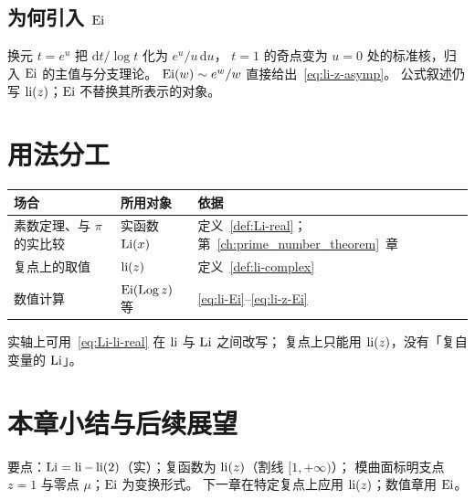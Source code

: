 \subsection{为何引入 \texorpdfstring{$\operatorname{Ei}$}{Ei}}

换元 $t=e^{u}$ 把 $\mathrm{d}t/\log t$ 化为 $e^{u}/u\,\mathrm{d}u$，
$t=1$ 的奇点变为 $u=0$ 处的标准核，归入 $\operatorname{Ei}$ 的主值与分支理论。
$\operatorname{Ei}(w)\sim e^{w}/w$ 直接给出~\eqref{eq:li-z-asymp}。
公式叙述仍写 $\operatorname{li}(z)$；$\operatorname{Ei}$ 不替换其所表示的对象。

\section{用法分工}
\label{sec:Li-li-convention}

\begin{center}
\renewcommand{\arraystretch}{1.35}
\begin{tabular}{lll}
\hline
场合 & 所用对象 & 依据 \\
\hline
素数定理、与 $\pi$ 的实比较 &
  实函数 $\operatorname{Li}(x)$ &
  定义~\ref{def:Li-real}；第~\ref{ch:prime_number_theorem}~章 \\
复点上的取值 &
  $\operatorname{li}(z)$ &
  定义~\ref{def:li-complex} \\
数值计算 &
  $\operatorname{Ei}(\operatorname{Log} z)$ 等 &
  \eqref{eq:li-Ei}--\eqref{eq:li-z-Ei} \\
\hline
\end{tabular}
\end{center}

实轴上可用~\eqref{eq:Li-li-real} 在 $\operatorname{li}$ 与 $\operatorname{Li}$ 之间改写；
复点上只能用 $\operatorname{li}(z)$，没有「复自变量的 $\operatorname{Li}$」。

\section*{本章小结与后续展望}

要点：$\operatorname{Li}=\operatorname{li}-\operatorname{li}(2)$（实）；复函数为 $\operatorname{li}(z)$（割线 $[1,+\infty)$）；
模曲面标明支点 $z=1$ 与零点 $\mu$；$\operatorname{Ei}$ 为变换形式。
下一章在特定复点上应用 $\operatorname{li}(z)$；数值章用 $\operatorname{Ei}$。
